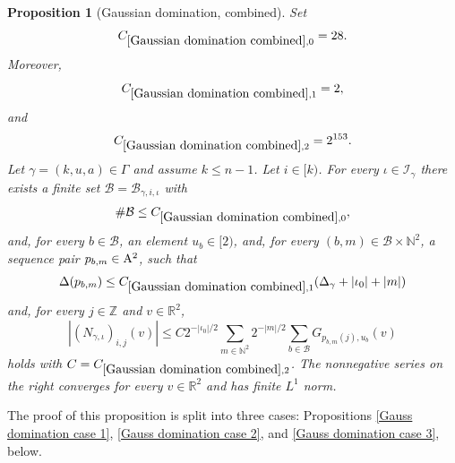 \documentclass[12pt,reqno]{amsart}
\theoremstyle{plain}
\newtheorem{proposition}[theorem]{Proposition}
\numberwithin{equation}{section}
\theoremstyle{remark}
\newcommand{\Z}{{\mathbb Z}}
\newcommand{\R}{{\mathbb R}}
\newcommand{\N}{{\mathbb N}}
\newcommand{\jr}[1]{{\color{orange}{[J: #1]}}}
\begin{document}
\begin{proposition}[Gaussian domination, combined]\label{Gaussian domination combined}\jr{GPT: Put the following three constant definitions in one line, similar elsewhere}
Set
\begin{equation}\label{Gaussian domination combined constants}
C_{\ref{Gaussian domination combined},0}=28.
\end{equation}
Moreover,
\begin{equation}\label{auto:Gaussian-domination-combined-distance-constant}
C_{\ref{Gaussian domination combined},1}=2,
\end{equation}
and
\begin{equation}\label{auto:Gaussian-domination-combined-majorant-constant}
C_{\ref{Gaussian domination combined},2}=2^{153}.
\end{equation}
Let $\gamma=(k,u,a)\in\Gamma$ and assume $k\le n-1$. Let $i\in[k)$. For every $\iota\in\mathcal I_\gamma$ there exists a finite set $\mathcal B=\mathcal B_{\gamma,i,\iota}$ with
\begin{equation}\label{auto:Gaussian-domination-index-cardinality}
\#\mathcal B\le C_{\ref{Gaussian domination combined},0},
\end{equation}
and, for every $b\in\mathcal B$, an element $u_b\in[2)$, and, for every $(b,m)\in\mathcal B\times\N^2$, a sequence pair $p_{b,m}\in{\rm A}^2$, such that
\begin{equation}\label{Gaussian domination combined distance}
\Delta(p_{b,m})\le C_{\ref{Gaussian domination combined},1}(\Delta_\gamma+|\iota_0|+|m|)
\end{equation}
and, for every $j\in\Z$ and $v\in\R^2$,
\begin{equation}\label{Gaussian domination main estimate}
|(N_{\gamma,\iota})_{i,j}(v)|
\le C 2^{-|\iota_0|/2}
\sum_{m\in\N^2}2^{-|m|/2}
\sum_{b\in\mathcal B}G_{p_{b,m}(j),u_b}(v)
\end{equation}
holds with $C=C_{\ref{Gaussian domination combined},2}$.
The nonnegative series on the right converges for every $v\in\R^2$ and has finite $L^1$ norm.
\end{proposition}

The proof of this proposition is split into three cases: Propositions \ref{Gauss domination case 1}, \ref{Gauss domination case 2}, and \ref{Gauss domination case 3}, below.
\end{document}
